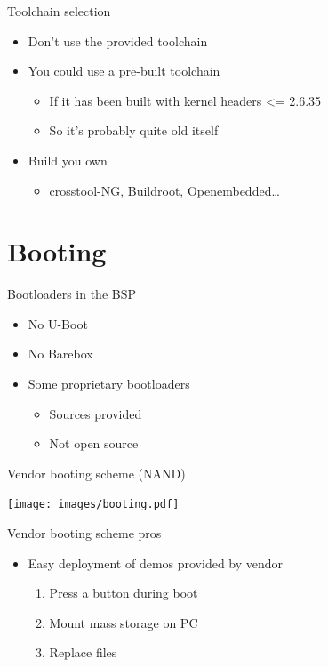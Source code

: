 \documentclass[xetex,table]{beamer}
\begin{document}
\begin{frame}{Toolchain selection}
  \begin{itemize}
  \item Don't use the provided toolchain
  \item You could use a pre-built toolchain
    \begin{itemize}
    \item If it has been built with kernel headers <= 2.6.35
    \item So it's probably quite old itself
    \end{itemize}
  \item Build you own
    \begin{itemize}
    \item crosstool-NG, Buildroot, Openembedded\dots
    \end{itemize}
  \end{itemize}
\end{frame}

\section{Booting}

\begin{frame}{Bootloaders in the BSP}
  \begin{itemize}
  \item No U-Boot
  \item No Barebox
  \item Some proprietary bootloaders
    \begin{itemize}
    \item Sources provided
    \item Not open source
    \end{itemize}
  \end{itemize}
\end{frame}

\begin{frame}{Vendor booting scheme (NAND)}
  \begin{center}
    \texttt{[image: images/booting.pdf]}
  \end{center}
\end{frame}

\begin{frame}{Vendor booting scheme pros}
  \begin{itemize}
  \item Easy deployment of demos provided by vendor
    \begin{enumerate}
    \item Press  a button during boot
    \item Mount mass storage on PC
    \item Replace files
    \end{enumerate}
  \end{itemize}
\end{frame}
\end{document}
